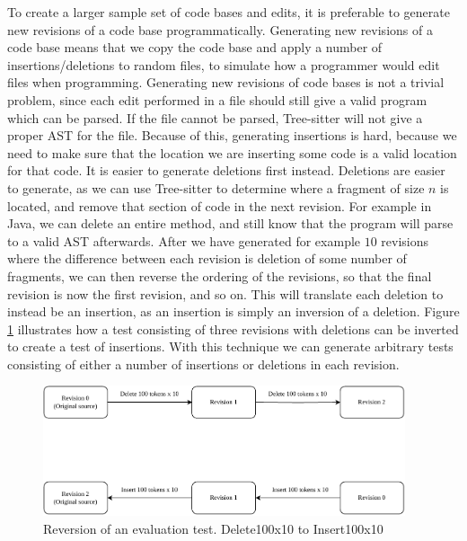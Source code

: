 To create a larger sample set of code bases and edits, it is preferable to generate new
revisions of a code base programmatically. Generating new revisions of a code base means
that we copy the code base and apply a number of insertions/deletions to random files, to
simulate how a programmer would edit files when programming. Generating new revisions of
code bases is not a trivial problem, since each edit performed in a file should still give
a valid program which can be parsed. If the file cannot be parsed, Tree-sitter will not
give a proper AST for the file. Because of this, generating insertions is hard, because we
need to make sure that the location we are inserting some code is a valid location for
that code. It is easier to generate deletions first instead. Deletions are easier to
generate, as we can use Tree-sitter to determine where a fragment of size $n$ is located,
and remove that section of code in the next revision. For example in Java, we can delete
an entire method, and still know that the program will parse to a valid AST afterwards.
After we have generated for example $10$ revisions where the difference between each
revision is deletion of some number of fragments, we can then reverse the ordering of the
revisions, so that the final revision is now the first revision, and so on. This will
translate each deletion to instead be an insertion, as an insertion is simply an inversion
of a deletion. Figure \ref{fig:revisioninversion} illustrates how a test consisting of
three revisions with deletions can be inverted to create a test of insertions. With this
technique we can generate arbitrary tests consisting of either a number of insertions or
deletions in each revision.

\begin{figure}[t]
    \begin{center}
        \includegraphics[width=0.95\textwidth]{figures/revisioninversion.drawio.pdf}
    \end{center}
    \caption{Reversion of an evaluation test. Delete100x10 to Insert100x10}
    \label{fig:revisioninversion}
\end{figure}

